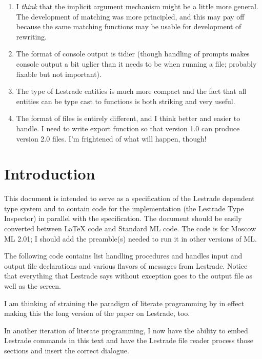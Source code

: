 \documentclass[12pt]{article}
\begin{document}
\begin{description}
\begin{enumerate}
\item  I {\em think\/} that the implicit argument mechanism might be a little more general.  The development
of matching was more principled, and this may pay off because the same matching functions may be usable for
development of rewriting.

\item  The format of console output is tidier (though handling of prompts makes console output
a bit uglier than it needs to be when running a file;  probably fixable but not important).

\item  The type of Lestrade entities is much more compact and the fact that all entities can
be type cast to functions is both striking and very useful.

\item  The format of files is entirely different, and I think better and easier to handle.  I need to write export function so that version 1.0 can produce version 2.0 files.  I'm frightened of what will happen, though!

\end{enumerate}



\end{description}

\newpage

\section{Introduction}

This document is intended to serve as a specification of the Lestrade dependent type system and to contain code for the implementation (the Lestrade Type Inspector)  in parallel with the specification.  The document
should be easily converted between LaTeX code and Standard ML code.  The code is for Moscow ML 2.01;  I should add the preamble(s) needed to run it in other versions of ML.

The following code contains list handling procedures and handles input and output file declarations and various flavors of messages from Lestrade.  Notice that everything
that Lestrade says without exception goes to the output file as well as the screen.

I am thinking of straining the paradigm of literate programming by in effect making this the long version of the paper on Lestrade, too.

In another iteration of literate programming, I now have the ability to embed Lestrade commands in this text and have the Lestrade file reader process those sections
and insert the correct dialogue.
\end{document}
